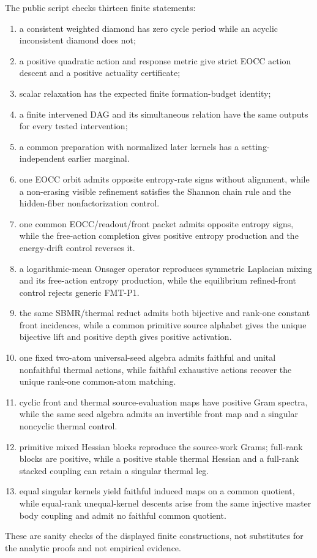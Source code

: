 \documentclass[11pt]{article}
\begin{document}
The public script checks thirteen finite statements:
\begin{enumerate}
\item a consistent weighted diamond has zero cycle period while an acyclic
      inconsistent diamond does not;
\item a positive quadratic action and response metric give strict EOCC action
      descent and a positive actuality certificate;
\item scalar relaxation has the expected finite formation-budget identity;
\item a finite intervened DAG and its simultaneous relation have the same
      outputs for every tested intervention;
\item a common preparation with normalized later kernels has a
      setting-independent earlier marginal.
\item one EOCC orbit admits opposite entropy-rate signs without alignment,
      while a non-erasing visible refinement satisfies the Shannon chain rule
      and the hidden-fiber nonfactorization control.
\item one common EOCC/readout/front packet admits opposite entropy signs,
      while the free-action completion gives positive entropy production and
      the energy-drift control reverses it.
\item a logarithmic-mean Onsager operator reproduces symmetric Laplacian
      mixing and its free-action entropy production, while the equilibrium
      refined-front control rejects generic FMT-P1.
\item the same SBMR/thermal reduct admits both bijective and rank-one constant
      front incidences, while a common primitive source alphabet gives the
      unique bijective lift and positive depth gives positive activation.
\item one fixed two-atom universal-seed algebra admits faithful and unital
      nonfaithful thermal actions, while faithful exhaustive actions recover
      the unique rank-one common-atom matching.
\item cyclic front and thermal source-evaluation maps have positive Gram
      spectra, while the same seed algebra admits an invertible front map and
      a singular noncyclic thermal control.
\item primitive mixed Hessian blocks reproduce the source-work Grams; full-rank
      blocks are positive, while a positive stable thermal Hessian and a
      full-rank stacked coupling can retain a singular thermal leg.
\item equal singular kernels yield faithful induced maps on a common quotient,
      while equal-rank unequal-kernel descents arise from the same injective
      master body coupling and admit no faithful common quotient.
\end{enumerate}
These are sanity checks of the displayed finite constructions, not substitutes
for the analytic proofs and not empirical evidence.




\end{document}
